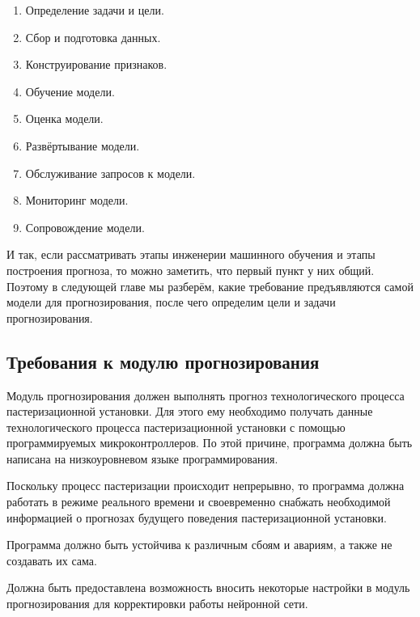 {  \begin{enumerate} 
    \item Определение задачи и цели. 
    \item Сбор и подготовка данных. 
    \item Конструирование признаков.
    \item Обучение модели.
    \item Оценка модели.
    \item Развёртывание модели.
    \item Обслуживание запросов к модели.
    \item Мониторинг модели.
    \item Сопровождение модели. 
  \end{enumerate} 

  \par \redline И так, если рассматривать этапы инженерии машинного обучения и этапы построения прогноза, то можно заметить, что первый пункт у них общий. Поэтому в следующей главе мы разберём, какие требование предъявляются самой модели для прогнозирования, после чего определим цели и задачи прогнозирования.

  \par
}

\titlespace
\subsection*{
  \cyrillicfont 
  \fontsize{14pt}{0pt}\selectfont
  \englishfont
   Требования к модулю прогнозирования
} 
\titlespace

{\cyrillicfont 
\fontsize{13pt}{16.25pt}\selectfont 
\englishfont 

  \par \redline Модуль прогнозирования должен выполнять прогноз технологического процесса пастеризационной установки. Для этого ему необходимо получать данные технологического процесса пастеризационной установки с помощью программируемых микроконтроллеров. По этой причине, программа должна быть написана на низкоуровневом языке программирования. 

  \par \redline Поскольку процесс пастеризации происходит непрерывно, то программа должна работать в режиме реального времени и своевременно снабжать необходимой информацией о прогнозах будущего поведения пастеризационной установки. 

  \par \redline Программа должно быть устойчива к различным сбоям и авариям, а также не создавать их сама. 

  \par \redline Должна быть предоставлена возможность вносить некоторые настройки в модуль прогнозирования для корректировки работы нейронной сети. 

  \par 
}


